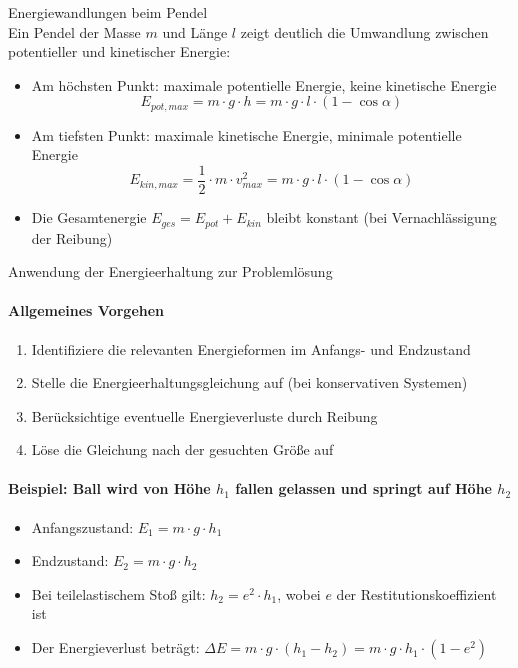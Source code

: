 \begin{example2}{Energiewandlungen beim Pendel}\\
    Ein Pendel der Masse $m$ und Länge $l$ zeigt deutlich die Umwandlung zwischen potentieller und kinetischer Energie:
    
    \begin{itemize}
        \item Am höchsten Punkt: maximale potentielle Energie, keine kinetische Energie
        \begin{equation}
            E_{pot,max} = m \cdot g \cdot h = m \cdot g \cdot l \cdot (1 - \cos\alpha)
        \end{equation}
        
        \item Am tiefsten Punkt: maximale kinetische Energie, minimale potentielle Energie
        \begin{equation}
            E_{kin,max} = \frac{1}{2} \cdot m \cdot v_{max}^2 = m \cdot g \cdot l \cdot (1 - \cos\alpha)
        \end{equation}
        
        \item Die Gesamtenergie $E_{ges} = E_{pot} + E_{kin}$ bleibt konstant (bei Vernachlässigung der Reibung)
    \end{itemize}
\end{example2}

\begin{KR}{Anwendung der Energieerhaltung zur Problemlösung}\\
    \paragraph{Allgemeines Vorgehen}
    \begin{enumerate}
        \item Identifiziere die relevanten Energieformen im Anfangs- und Endzustand
        \item Stelle die Energieerhaltungsgleichung auf (bei konservativen Systemen)
        \item Berücksichtige eventuelle Energieverluste durch Reibung
        \item Löse die Gleichung nach der gesuchten Größe auf
    \end{enumerate}
    
    \paragraph{Beispiel: Ball wird von Höhe $h_1$ fallen gelassen und springt auf Höhe $h_2$}
    \begin{itemize}
        \item Anfangszustand: $E_1 = m \cdot g \cdot h_1$
        \item Endzustand: $E_2 = m \cdot g \cdot h_2$
        \item Bei teilelastischem Stoß gilt: $h_2 = e^2 \cdot h_1$, wobei $e$ der Restitutionskoeffizient ist
        \item Der Energieverlust beträgt: $\Delta E = m \cdot g \cdot (h_1 - h_2) = m \cdot g \cdot h_1 \cdot (1 - e^2)$
    \end{itemize}
\end{KR}

